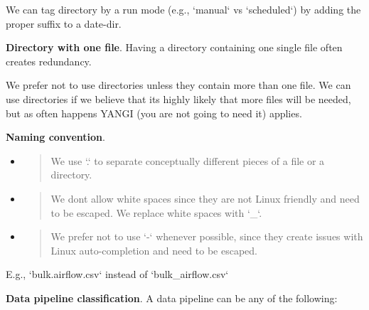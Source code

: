 \documentclass[11pt, reqno]{amsart}
\begin{document}
We can tag directory by a run mode (e.g., `manual` vs `scheduled`) by
adding the proper suffix to a date-dir.

\textbf{Directory with one file}. Having a directory containing one
single file often creates redundancy.

We prefer not to use directories unless they contain more than one file.
We can use directories if we believe that it\textquotesingle s highly
likely that more files will be needed, but as often happens YANGI (you
are not going to need it) applies.

\textbf{Naming convention}.

\begin{itemize}
\item
  \begin{quote}
  We use `.` to separate conceptually different pieces of a file or a
  directory.
  \end{quote}
\item
  \begin{quote}
  We don\textquotesingle t allow white spaces since they are not Linux
  friendly and need to be escaped. We replace white spaces with `\_`.
  \end{quote}
\item
  \begin{quote}
  We prefer not to use `-` whenever possible, since they create issues
  with Linux auto-completion and need to be escaped.
  \end{quote}
\end{itemize}

E.g., `bulk.airflow.csv` instead of `bulk\_airflow.csv`

\textbf{Data pipeline classification}. A data pipeline can be any of the
following:
\end{document}
